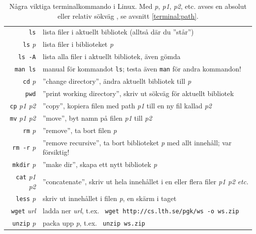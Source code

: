 \begin{table}[H]
\renewcommand{\arraystretch}{1.25}
   
\begin{tabular}{@{}r | l}
\texttt{ls} & lista filer i aktuellt bibliotek (alltså där du ''står'')\\
\texttt{ls} \textit{p}  & lista filer i biblioteket  \textit{p} \\
\texttt{ls -A} & lista alla filer i aktuellt bibliotek, även gömda \\
\texttt{man ls} & manual för kommandot \texttt{ls}; testa även \texttt{man} för andra kommandon! \\
\texttt{cd} \textit{p} & ''change directory'', ändra aktuellt bibliotek till \textit{p}\\
\texttt{pwd} & ''print working directory'', skriv ut sökväg för aktuellt bibliotek \\
\texttt{cp} \textit{p1 p2} & ''copy'', kopiera filen med path \textit{p1} till en ny fil kallad \textit{p2} \\
\texttt{mv} \textit{p1 p2} & ''move'', byt namn på filen \textit{p1} till \textit{p2}  \\
\texttt{rm} \textit{p} & ''remove'', ta bort filen \textit{p}\\
\texttt{rm -r} \textit{p} & ''remove recursive'', ta bort biblioteket \textit{p} med allt innehåll; var försiktig!\\
\texttt{mkdir} \textit{p} & ''make dir'', skapa ett nytt bibliotek \textit{p}\\
\texttt{cat} \textit{p1 p2}& ''concatenate'', skriv ut hela innehållet i en eller flera filer \textit{p1 p2 etc.}\\
\texttt{less} \textit{p}& skriv ut innehållet i filen \textit{p}, en skärm i taget\\
\texttt{wget} \textit{url}&ladda ner \textit{url}, t.ex. \texttt{ wget http://cs.lth.se/pgk/ws -o ws.zip}\\
\texttt{unzip} \textit{p}& packa upp \textit{p}, t.ex. \texttt{ unzip ws.zip}\\
\end{tabular}

    \caption{Några viktiga terminalkommando i Linux. Med \textit{p}, \textit{p1}, \textit{p2}, etc.  avses en absolut eller relativ sökväg , se avsnitt \ref{terminal:path}.}
    \label{fig:terminal:commands}

\end{table}

